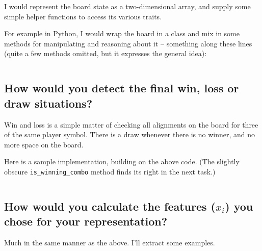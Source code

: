 \documentclass[11pt,a4paper]{article}
\begin{document}
      I would represent the board state as a two-dimensional array, and supply some simple helper functions to access its various traits.
      
      For example in Python, I would wrap the board in a class and mix in some methods for manipulating and reasoning about it -- something along these lines (quite a few methods omitted, but it expresses the general idea):
      
      \inputminted[lastline=42,linenos=true]{python}{src/board.py}
    
    
    \subsection{How would you detect the final win, loss or draw situations?} %
    \label{sub:how_would_you_detect_the_final_win_loss_or_draw_situations}
    
      Win and loss is a simple matter of checking all alignments on the board for three of the same player symbol.
      There is a draw whenever there is no winner, and no more space on the board.
      
      Here is a sample implementation, building on the above code. (The slightly obscure \texttt{is\_winning\_combo} method finds its right in the next task.)
      
      \inputminted[firstline=44,firstnumber=44,lastline=72,linenos=true]{python}{src/board.py}
    
  
    \subsection{How would you calculate the features ($x_i$) you chose for your representation?} %
    \label{sub:how_would_you_calculate_the_features_x_i_you_chose_for_your_representation_}
    
      Much in the same manner as the above. I'll extract some examples.
      
      \inputminted[firstline=74,firstnumber=74,lastline=100,linenos=true]{python}{src/board.py}
    
    
\end{document}
